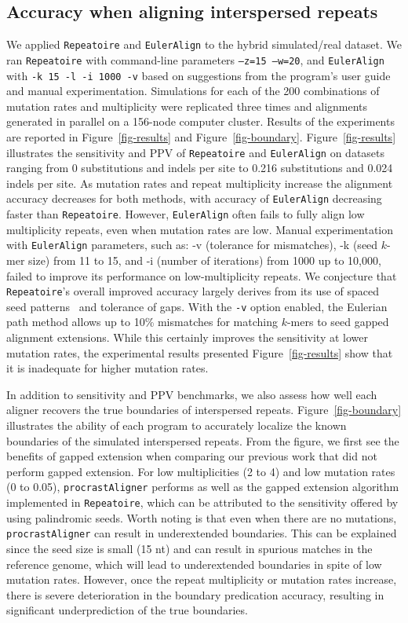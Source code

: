 \documentclass[12pt,journal,letterpaper,onecolumn, draftcls]{IEEEtran}
\begin{document}
\subsection*{Accuracy when aligning interspersed repeats}
We applied \texttt{Repeatoire} and \texttt{EulerAlign} to the
hybrid simulated/real dataset.  We ran \texttt{Repeatoire}
with command-line parameters \texttt{--z=15 --w=20}, and
\texttt{EulerAlign} with \texttt{-k 15 -l -i 1000 -v} based on suggestions
from the program's user guide and manual experimentation.
Simulations for each of the 200 combinations of mutation rates and
multiplicity were replicated three times and alignments generated in
parallel on a 156-node computer cluster.   Results of the experiments
are reported in Figure~\ref{fig-results} and
Figure~\ref{fig-boundary}. Figure~\ref{fig-results} illustrates the
sensitivity and PPV of
\texttt{Repeatoire} and
\texttt{EulerAlign} on datasets ranging from 0 substitutions and
indels per site to 0.216 substitutions and 0.024 indels per site.  As
mutation rates and repeat multiplicity increase the alignment accuracy
decreases for both methods, with accuracy of \texttt{EulerAlign}
decreasing faster than \texttt{Repeatoire}.  However, \texttt{EulerAlign}
often fails to fully align low multiplicity repeats, even when mutation rates are low.
Manual experimentation with \texttt{EulerAlign} parameters, such as: -v (tolerance for mismatches), -k (seed $k$-mer size) from 11 to 15, and -i (number of iterations) from 1000 up to 10,000, failed to improve its performance on low-multiplicity repeats.
We conjecture that \texttt{Repeatoire}'s overall improved accuracy largely derives
from its use of spaced seed patterns~\cite{ref-procrast} and tolerance
of gaps. With the \texttt{-v} option enabled, the Eulerian path method allows up to 10\% mismatches for matching $k$-mers to seed gapped alignment extensions. While this certainly improves the sensitivity at lower mutation rates, the experimental results presented Figure~\ref{fig-results} show that it is inadequate for higher mutation rates.

In addition to sensitivity and PPV benchmarks, we also assess how well
each aligner recovers the true boundaries of interspersed
repeats.  Figure~\ref{fig-boundary} illustrates the ability of each
program to accurately localize the known boundaries of the simulated interspersed
repeats. From the figure, we first see the benefits of gapped extension when comparing our previous work
that did not perform gapped extension. For low multiplicities (2 to 4) and low mutation rates (0 to 0.05), \texttt{procrastAligner} performs as well
as the gapped extension algorithm implemented in \texttt{Repeatoire}, which can be attributed to the sensitivity offered by using palindromic seeds. Worth noting is that even when there are no mutations, \texttt{procrastAligner} can result in underextended boundaries. This can be explained since the seed size is small (15 nt) and can result in spurious matches in the reference genome, which will lead to underextended boundaries in spite of low mutation rates. However, once the repeat multiplicity or mutation rates increase, there is severe deterioration in the boundary predication accuracy, resulting in significant underprediction of the true boundaries.
\end{document}
